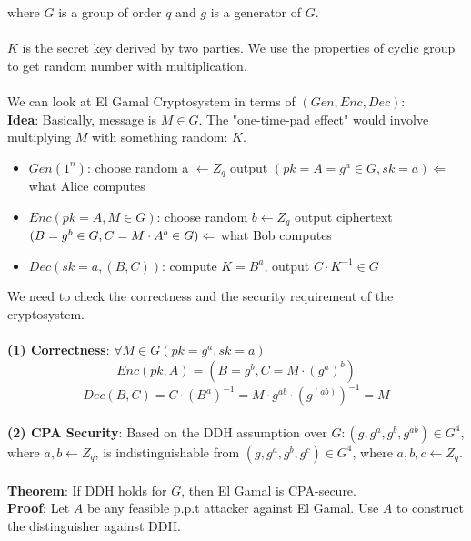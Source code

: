 \documentclass{scribe}
\begin{document}
where $G$ is a group of order $q$ and $g$ is a generator of $G$.
\\\\
$K$  is the secret key derived by two parties. We use the properties of cyclic group to get random number with multiplication.
\\\\
We can look at El Gamal Cryptosystem in terms of $(Gen, Enc, Dec):$
\\
\textbf{Idea}: Basically, message is $M \in G$. The "one-time-pad effect" would involve multiplying $M$ with something random: $K$. 
\begin{itemize} 
    \item $Gen(1^n)$: choose random a $\leftarrow Z_q $ output $(pk=A=g^a \in G, sk=a) \Leftarrow$ what Alice computes
    \item $Enc(pk=A,M \in G)$: choose random $b \leftarrow Z_q$ output ciphertext $(B = g^b \in G, \\C = M \cdot A^b \in G) \Leftarrow $ what Bob computes
    \item $Dec(sk=a,(B,C))$: compute $K=B^a$, output $C \cdot K^{-1} \in G$
\end{itemize}
We need to check the correctness and the security requirement of the cryptosystem.
\\
\\
\textbf{(1) Correctness}: $\forall M \in G$\text{, }$(pk=g^a,sk=a)$
\[Enc(pk,A) = (B = g^b, C = M \cdot (g^a)^b)\]
\[Dec(B,C) = C \cdot (B^a)^{-1} = M \cdot g^{ab} \cdot (g^{(ab)})^{-1} = M\]
\vspace{5mm}
\\
\noindent\textbf{(2) CPA Security}: Based on the DDH assumption over $G: (g,g^a,g^b,g^{ab}) \in G^4$, where $a,b \leftarrow Z_q$, is indistinguishable from $(g,g^a,g^b,g^{c}) \in G^4$, where $a,b,c \leftarrow Z_q$.
\\\\
\textbf{Theorem}: If DDH holds for $G$, then El Gamal is CPA-secure.
\\
\textbf{Proof}: Let $A$ be any feasible p.p.t attacker against El Gamal. Use $A$ to construct the distinguisher against DDH.
\\\\
\end{document}
